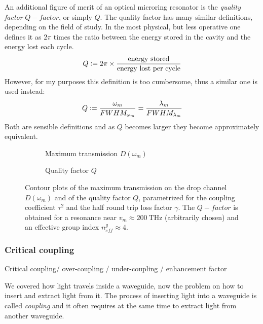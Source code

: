 An additional figure of merit of an optical microring resonator is the \textit{quality factor} $Q-factor$, or simply $Q$.
The quality factor has many similar definitions, depending on the field of study.
In the most physical, but less operative one defines it as $2\pi$ times the ratio between the energy stored in the cavity and the energy lost each cycle.
$$Q \vcentcolon= 2\pi \times \frac{\mathrm{energy~stored}}{\mathrm{energy~lost~per~cycle}}$$
However, for my purposes this definition is too cumbersome, thus a similar one is used instead:
\begin{equation}
Q \vcentcolon= \dfrac{\omega_m}{FWHM_{\omega_m}} = \dfrac{\lambda_m}{FWHM_{\lambda_m}}
\end{equation}
Both are sensible definitions and as $Q$ becomes larger they become approximately equivalent.

\begin{figure}
	\centering
	\begin{subfigure}[t]{0.47\textwidth}
		\centering
		
		\caption{Maximum transmission $D\left( \omega_m \right)$}
		\label{fig:D_contour}
	\end{subfigure}
	\hspace{0.03\textwidth}
	\begin{subfigure}[t]{0.47\textwidth}
		\centering
		
		\caption{Quality factor $Q$}
		\label{fig:Q_contour}
	\end{subfigure}
	\caption{Contour plots of the maximum transmission on the drop channel $D\left( \omega_m \right)$ and of the quality factor $Q$, parametrized for the coupling coefficient $\tau^2$ and the half round trip loss factor $\gamma$.
	The $Q-factor$ is obtained for a resonance near $v_m\approx\SI{200}{\THz}$ (arbitrarily chosen) and an effective group index $n_{eff}^g \approx 4$.
	}
	\label{fig:APF_contour_plots}
\end{figure}

\subsubsection{Critical coupling}
\label{sssec:Critical_coupling}
Critical coupling/ over-coupling / under-coupling / enhancement factor

We covered how light travels inside a waveguide, now the problem on how to insert and extract light from it.
The process of inserting light into a waveguide is called \textit{coupling} and it often requires at the same time to extract light from another waveguide.

